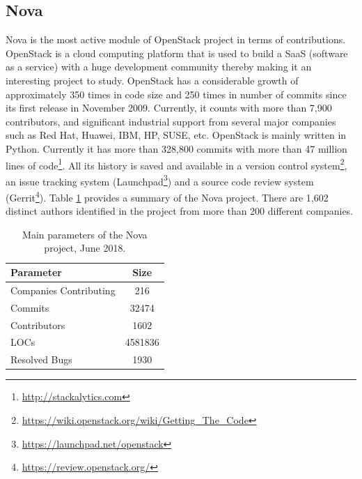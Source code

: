 \documentclass[a4paper, 12pt]{book}
\begin{document}
\subsection{Nova}

Nova is the most active module of OpenStack project in terms of contributions. OpenStack is a cloud computing platform that is used to build a SaaS (software as a service) with a huge development community thereby making it an interesting project to study. OpenStack has a considerable growth of approximately 350 times in code size and 250 times in number of commits since its first release in November 2009.  Currently, it counts with more than 7,900 contributors, and significant industrial support from several major companies such as Red Hat, Huawei, IBM, HP, SUSE, etc. OpenStack is mainly written in Python. Currently it has more than 328,800 commits with more than 47 million lines of code\footnote{\url{http://stackalytics.com}}. All its history is saved and available in a version control system\footnote{\url{https://wiki.openstack.org/wiki/Getting_The_Code}}, an issue tracking system (Launchpad\footnote{\url{https://launchpad.net/openstack}}) and a source code review system (Gerrit\footnote{\url{https://review.openstack.org/}}).  Table \ref{tablenova} provides a summary of the Nova project. There are 1,602 distinct authors identified in the project from more than 200 different companies. 

 \begin{table}[!t]
\renewcommand{\arraystretch}{0.8}
\caption{Main parameters of the Nova project, June 2018.}
\label{tablenova}
\centering

\begin{tabular}{|l|c|}
\hline
Parameter & Size \\
\hline
\hline
Companies Contributing &  216 \\
\hline
Commits & 32474 \\
\hline
Contributors & 1602 \\
\hline
LOCs & 4581836\\
\hline
Resolved Bugs &1930\\
\hline
\end{tabular}
\end{table}
\end{document}
